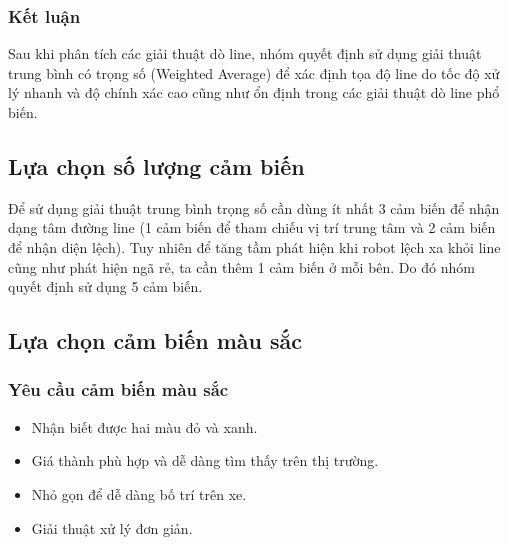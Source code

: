             \subsubsection{Kết luận}
                \hspace*{0.6cm}Sau khi phân tích các giải thuật dò line, nhóm quyết định sử dụng giải thuật trung bình có trọng số (Weighted Average) để xác định tọa độ line do tốc độ xử lý nhanh và độ chính xác cao cũng như ổn định trong các giải thuật dò line phổ biến.
        \subsection{Lựa chọn số lượng cảm biến}
            \hspace*{0.6cm}Để sử dụng giải thuật trung bình trọng số cần dùng ít nhất 3 cảm biến để nhận dạng tâm đường line (1 cảm biến để tham chiếu vị trí trung tâm và 2 cảm biến để nhận diện lệch). Tuy nhiên để tăng tầm phát hiện khi robot lệch xa khỏi line cũng như phát hiện ngã rẻ, ta cần thêm 1 cảm biến ở mỗi bên. Do đó nhóm quyết định sử dụng 5 cảm biến. 
    \subsection{Lựa chọn cảm biến màu sắc}
        \subsubsection{Yêu cầu cảm biến màu sắc}
            \begin{itemize}
                \item Nhận biết được hai màu đỏ và xanh.
                \item Giá thành phù hợp và dễ dàng tìm thấy trên thị trường. 
                \item Nhỏ gọn để dễ dàng bố trí trên xe. 
                \item Giải thuật xử lý đơn giản.
            \end{itemize}
        \newpage
